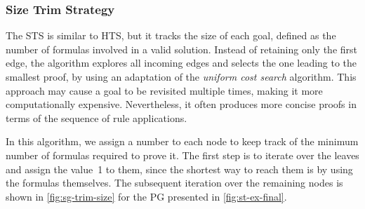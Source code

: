 \subsubsection*{Size Trim Strategy} 
The \gls{STS} is similar to \gls{HTS}, but it tracks the size of each goal, defined as the number of formulas involved in a valid solution. Instead of retaining only the first edge, the algorithm explores all incoming edges and selects the one leading to the smallest proof, by using an adaptation of the \emph{uniform cost search} algorithm. This approach may cause a goal to be revisited multiple times, making it more computationally expensive. Nevertheless, it often produces more concise proofs in terms of the sequence of rule applications.

In this algorithm, we assign a number to each node to keep track of the minimum number of formulas required to prove it. The first step is to iterate over the leaves and assign the value~1 to them, since the shortest way to reach them is by using the formulas themselves. The subsequent iteration over the remaining nodes is shown in \autoref{fig:sg-trim-size} for the \gls{PG} presented in \autoref{fig:st-ex-final}.

